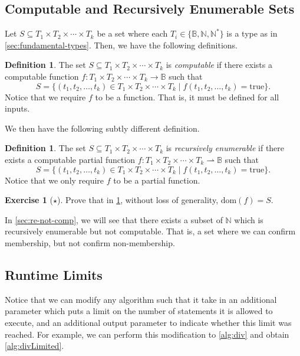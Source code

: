 \documentclass[11pt,a4paper,reqno]{amsart}
\theoremstyle{plain}
\theoremstyle{definition}
\newtheorem{definition}[theorem]{Definition}
\theoremstyle{definition}
\newtheorem{exercise}[theorem]{Exercise}
\newcommand\exerciseLevelEasy{$\star$}
\begin{document}
\subsection{Computable and Recursively Enumerable Sets}\label{sec:re-sets}

Let $S \subseteq T_1\times T_2\times\cdots \times T_k$ be a set where each $T_i \in \{\mathbb B, \mathbb N, \mathbb N^*\}$ is a type as in \cref{sec:fundamental-types}.
Then, we have the following definitions.

\begin{definition}
	The set $S \subseteq T_1\times T_2\times\cdots \times T_k$ is \emph{computable} if there exists a computable function $f\colon T_1\times T_2\times\cdots \times T_k \to\mathbb B$ such that
	\[
		S = \{ (t_1,t_2,\ldots,t_k)\in T_1\times T_2\times\cdots \times T_k \mid f(t_1,t_2,\ldots,t_k)=\mathrm{true} \}.
	\]
	Notice that we require $f$ to be a function. That is, it must be defined for all inputs.
\end{definition}

We then have the following subtly different definition.

\begin{definition}\label{def:re-set}
	The set $S \subseteq T_1\times T_2\times\cdots \times T_k$ is \emph{recursively enumerable} if there exists a computable partial function $f\colon T_1\times T_2\times\cdots \times T_k \rightharpoonup\mathbb B$ such that
	\[
		S = \{ (t_1,t_2,\ldots,t_k)\in T_1\times T_2\times\cdots \times T_k \mid f(t_1,t_2,\ldots,t_k)=\mathrm{true} \}.
	\]
	Notice that we only require $f$ to be a partial function.
\end{definition}

\begin{exercise}[\exerciseLevelEasy]
	Prove that in \cref{def:re-set}, without loss of generality, $\mathrm{dom}(f) = S$.
\end{exercise}

In \cref{sec:re-not-comp}, we will see that there exists a subset of $\mathbb N$ which is recursively enumerable but not computable.
That is, a set where we can confirm membership, but not confirm non-membership.

\subsection{Runtime Limits}\label{sec:runtime-limit}

Notice that we can modify any algorithm such that it take in an additional parameter which puts a limit on the number of statements it is allowed to execute, and an additional output parameter to indicate whether this limit was reached.
For example, we can perform this modification to \cref{alg:div} and obtain \cref{alg:divLimited}.
\end{document}

